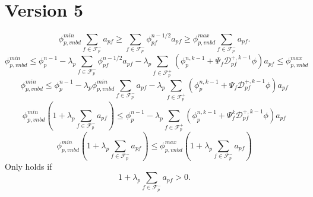 \documentclass[../thesis.tex]{subfiles}
\begin{document}
\section{Version 5}
\[
	\phi_{p,vnbd}^{min} \sum_{f \in \mathcal{F}_p^-} a_{pf}
	\geq
	\sum_{f \in \mathcal{F}_p^-} \phi_{pf}^{n-1/2} a_{pf}
	\geq
	\phi_{p,vnbd}^{max} \sum_{f \in \mathcal{F}_p^-} a_{pf}.
\]
\begin{equation*}
	\phi_{p, vnbd}^{min}
	\leq
	\phi_p^{n-1}
	- \lambda_p\sum_{f \in \mathcal{F}_p^-} \phi_{pf}^{n-1/2} a_{pf}
	- \lambda_p\sum_{f \in \mathcal{F}_p^+}
	\left( \phi_p^{n,k-1} + \Psi_{f}^{} \mathcal{D}^{+,k-1}_{pf}\phi \right) a_{pf}
	\leq
	\phi_{p, vnbd}^{max}
\end{equation*}
\begin{equation*}
	\phi_{p, vnbd}^{min}
	\leq
	\phi_p^{n-1}
	- \lambda_p \phi_{p, vnbd}^{min} \sum_{f \in \mathcal{F}_p^-} a_{pf}
	- \lambda_p\sum_{f \in \mathcal{F}_p^+}
	\left( \phi_p^{n,k-1} + \Psi_{f}^{} \mathcal{D}^{+,k-1}_{pf}\phi \right) a_{pf}
\end{equation*}
\begin{equation*}
	\phi_{p, vnbd}^{min}
	\left( 1 + \lambda_p \sum_{f \in \mathcal{F}_p^-} a_{pf} \right)
	\leq
	\phi_p^{n-1}
	- \lambda_p\sum_{f \in \mathcal{F}_p^+}
	\left( \phi_p^{n,k-1} + \Psi_{f}^{k} \mathcal{D}^{+,k-1}_{pf}\phi \right) a_{pf}
\end{equation*}
\begin{equation*}
	\phi_{p, vnbd}^{min}
	\left( 1 + \lambda_p \sum_{f \in \mathcal{F}_p^-} a_{pf} \right)
	\leq
	\phi_{p, vnbd}^{max}
	\left( 1 + \lambda_p \sum_{f \in \mathcal{F}_p^-} a_{pf} \right)
\end{equation*}
Only holds if \[ 1 + \lambda_p \sum_{f \in \mathcal{F}_p^-} a_{pf} > 0. \]
\end{document}

